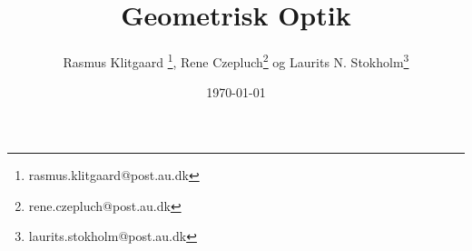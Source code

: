 \documentclass[danish, a4paper, twocolumn, oneside]{memoir}
\title{Geometrisk Optik}
\author{Rasmus Klitgaard \thanks{rasmus.klitgaard@post.au.dk}, Rene Czepluch\thanks{rene.czepluch@post.au.dk} og Laurits N. Stokholm\thanks{laurits.stokholm@post.au.dk}}
\date{\today}
\begin{document}
\maketitle
\noindent
%
%
%
%
%
%
\end{document}
